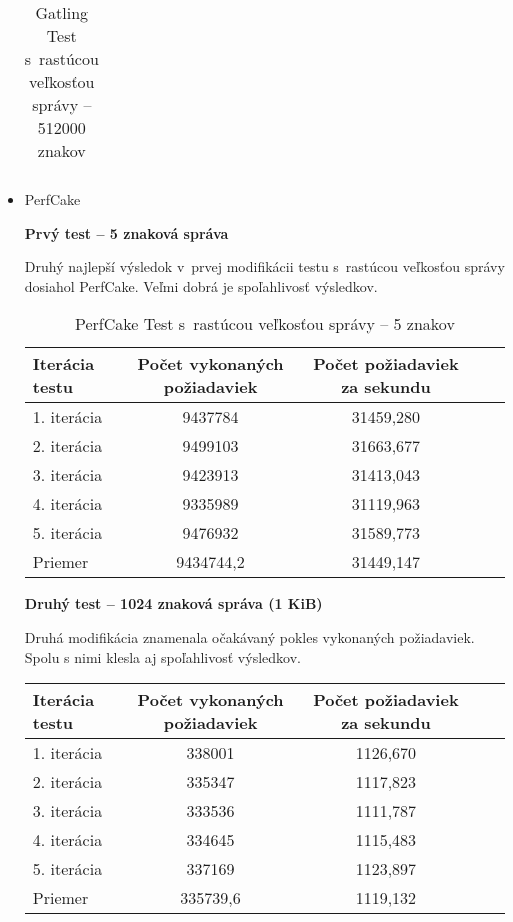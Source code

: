 \documentclass[12pt,oneside,final]{fithesis-utf8}
\begin{document}
\begin{itemize}
\begin{table}[H]
\begin{center}
\begin{tabular}{ | l | c | c | c | c |}
\end{tabular}
\end{center}
\caption{Gatling Test s~rastúcou veľkosťou správy -- 512000 znakov}
\end{table}


\item PerfCake

\textbf{Prvý test -- 5 znaková správa}

Druhý najlepší výsledok v~prvej modifikácii testu s~rastúcou veľkosťou správy dosiahol PerfCake. Veľmi dobrá je spoľahlivosť výsledkov.

\begin{table}[H]
\begin{center}
\begin{tabular}{ | l | c | c | c | c |}
		\hline
		 \textbf{Iterácia testu} & \textbf{Počet vykonaných požiadaviek} & \textbf{Počet požiadaviek za sekundu} \\ \hline
		 1. iterácia & 9437784 & 31459,280 \\ \hline
		 2. iterácia & 9499103 & 31663,677 \\ \hline
		 3. iterácia & 9423913 & 31413,043 \\ \hline
		 4. iterácia & 9335989 & 31119,963 \\ \hline
		 5. iterácia & 9476932 & 31589,773 \\ \hline
		 Priemer & 9434744,2 & 31449,147 \\ \hline
		 
\end{tabular}
\end{center}
\caption{PerfCake Test s~rastúcou veľkosťou správy -- 5 znakov}
\end{table}


\textbf{Druhý test -- 1024 znaková správa (1 KiB)}

Druhá modifikácia znamenala očakávaný pokles vykonaných požiadaviek. Spolu s nimi klesla aj spoľahlivosť výsledkov.

\begin{table}[H]
\begin{center}
\begin{tabular}{ | l | c | c | c | c |}
		\hline
		 \textbf{Iterácia testu} & \textbf{Počet vykonaných požiadaviek} & \textbf{Počet požiadaviek za sekundu} \\ \hline
		 1. iterácia & 338001 & 1126,670 \\ \hline
		 2. iterácia & 335347 & 1117,823 \\ \hline
		 3. iterácia & 333536 & 1111,787 \\ \hline
		 4. iterácia & 334645 & 1115,483 \\ \hline
		 5. iterácia & 337169 & 1123,897 \\ \hline
		 Priemer & 335739,6 & 1119,132 \\ \hline
		 

\end{tabular}
\end{center}
\end{table}
\end{itemize}
\end{document}
